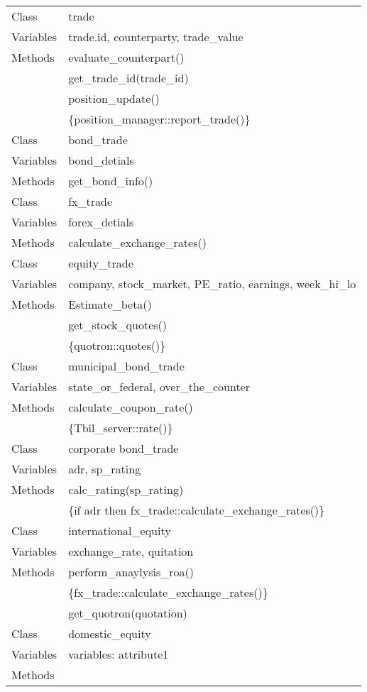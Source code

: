 \documentclass[a4paper,titlepage]{artikel1}
\begin{document}
   \begin{tabular}[t]{|l|l|}
     \hline
     Class & trade \\
     Variables & trade.id, counterparty, trade\_value \\
     Methods & evaluate\_counterpart() \\
     & get\_trade\_id(trade\_id) \\
     & position\_update() \\
     & \{position\_manager::report\_trade()\} \\
     \hline
     Class & bond\_trade \\
     Variables & bond\_detials \\
     Methods & get\_bond\_info() \\
     \hline
     Class & fx\_trade \\
     Variables & forex\_detials \\
     Methods & calculate\_exchange\_rates() \\
     \hline
     Class & equity\_trade \\
     Variables & company, stock\_market, PE\_ratio,  earnings, week\_hi\_lo \\
     Methods & Estimate\_beta() \\
     & get\_stock\_quotes() \\
     & \{quotron::quotes()\} \\
     \hline
     Class &municipal\_bond\_trade \\
     Variables & state\_or\_federal, over\_the\_counter \\
     Methods & calculate\_coupon\_rate() \\
     & \{Tbil\_server::rate()\} \\
     \hline
     Class & corporate bond\_trade \\
     Variables & adr, sp\_rating \\
     Methods & calc\_rating(sp\_rating) \\
     & \{if adr then fx\_trade::calculate\_exchange\_rates()\} \\
     \hline
     Class & international\_equity \\
     Variables & exchange\_rate, quitation \\
     Methods & perform\_anaylysis\_roa()\\
     & \{fx\_trade::calculate\_exchange\_rates()\}\\
     & get\_quotron(quotation) \\
     \hline
     Class & domestic\_equity \\
     Variables & variables: attribute1\\
     Methods & \\
     \hline
   \end{tabular}
\end{document}
